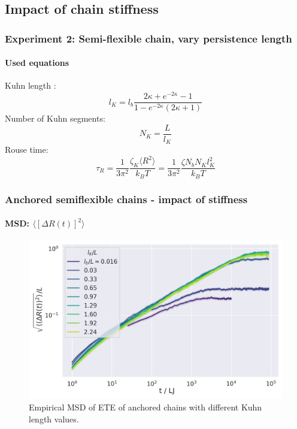 \documentclass[handout]{beamer}
\newcommand{\mean}[1]{\langle #1 \rangle}
\begin{document}
\subsection{Impact of chain stiffness}

\begin{frame}
    \frametitle{Experiment 2: Semi-flexible chain, vary persistence length}
    \framesubtitle{Used equations}

    Kuhn length \cite{svaneborg_2020}:
    \begin{equation}
        l_K = l_b \frac{2\kappa + e^{-2 \kappa} - 1}{1-e^{-2\kappa}(2 \kappa + 1)}
    \end{equation}
    Number of Kuhn segments:
    \begin{equation} 
        N_K = \frac{L}{l_K}
    \end{equation}
    Rouse time:
    \begin{equation} \label{eq:tau_R_kuhn}
        \tau_R = \frac{1}{3 \pi^2} \frac{\zeta_{K} \mean{R^2}}{k_B T} = \frac{1}{3 \pi^2} \frac{\zeta N_b N_K l_K^2}{k_B T}
    \end{equation}
\end{frame}


\begin{frame}
    \frametitle{Anchored semiflexible chains - impact of stiffness}
    \framesubtitle{MSD: $\mean{[\Delta R(t)]^2}$}

    \begin{figure}
        \centering
        \includegraphics[width=\columnwidth,trim={0cm 0cm 0cm 0.0cm},clip]{4-exp-delta_R-bare-log.png}
        \caption{Empirical MSD of ETE of anchored chains with different Kuhn length values.}
        \label{fig:msd_anchored_l_K}
    \end{figure}
\end{frame}
\end{document}
